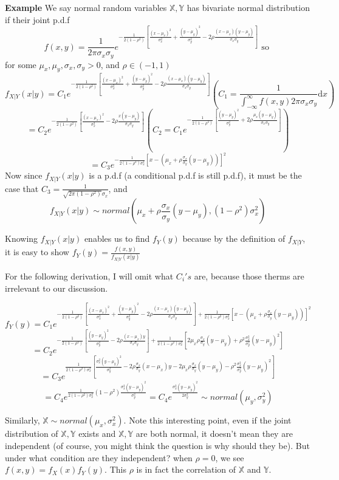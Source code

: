 \documentclass[a4paper,12pt]{article}
\begin{document}
\textbf{Example} We say normal random variables $\mathbb{X}, \mathbb{Y}$ has bivariate normal distribution if their joint p.d.f
$$f(x, y) = \frac{1}{2\pi\sigma_x\sigma_y}e^{ -\frac{1}{2(1-\rho^2)} [\frac{(x-\mu_x)^2}{\sigma^2_x} + \frac{(y-\mu_y)^2}{\sigma^2_y} - 2\rho\frac{(x-\mu_x)(y-\mu_y)}{\sigma_x\sigma_y}]} \text{ so }$$
for some $\mu_x, \mu_y, \sigma_x, \sigma_y > 0$, and $\rho \in (-1, 1)$
$$f_{X|Y}(x|y) = C_1 e^{ -\frac{1}{2(1-\rho^2)} [\frac{(x-\mu_x)^2}{\sigma^2_x} + \frac{(y-\mu_y)^2}{\sigma^2_y} - 2\rho\frac{(x-\mu_x)(y-\mu_y)}{\sigma_x\sigma_y}]} (C_1 = \frac{1}{\int_{-\infty}^\infty f(x, y) 2\pi\sigma_x\sigma_y} \mathrm{d}x)$$
$$= C_2 e^{ -\frac{1}{2(1-\rho^2)} [\frac{(x-\mu_x)^2}{\sigma^2_x} - 2\rho\frac{x(y-\mu_y)}{\sigma_x\sigma_y}] } (C_2 = C_1 e^{-\frac{1}{2(1-\rho^2)} [ \frac{(y-\mu_y)^2}{\sigma^2_y} + 2\rho\frac{\mu_x(y-\mu_y)}{\sigma_x\sigma_y}]})$$
$$= C_3 e^{-\frac{1}{2(1-\rho^2)\sigma^2_x} [x-(\mu_x + \rho\frac{\sigma_x}{\sigma_y}(y-\mu_y))]^2}$$
Now since $f_{X|Y}(x|y)$ is a p.d.f (a conditional p.d.f is still p.d.f), it must be the case that $C_3 = \frac{1}{\sqrt{2\pi(1-\rho^2)}\sigma_x}$, and $$f_{X|Y}(x|y) \sim normal( \mu_x + \rho\frac{\sigma_x}{\sigma_y}(y-\mu_y), (1-\rho^2)\sigma^2_x )$$

Knowing $f_{X|Y}(x|y)$ enables us to find $f_Y(y)$ because by the definition of $f_{X|Y}$, it is easy to show $f_Y(y) = \frac{f(x, y)}{f_{X|Y}(x|y)} $ 

For the following derivation, I will omit what $C_i's$ are, because those therms are irrelevant to our discussion.

$$f_Y(y) = C_1 e^{ -\frac{1}{2(1-\rho^2)} [\frac{(x-\mu_x)^2}{\sigma^2_x} + \frac{(y-\mu_y)^2}{\sigma^2_y} - 2\rho\frac{(x-\mu_x)(y-\mu_y)}{\sigma_x\sigma_y}] + \frac{1}{2(1-\rho^2)\sigma^2_x} [x-(\mu_x + \rho\frac{\sigma_x}{\sigma_y}(y-\mu_y))]^2}$$
$$= C_2 e^{ -\frac{1}{2(1-\rho^2)} [ \frac{(y-\mu_y)^2}{\sigma^2_y} - 2\rho\frac{(x-\mu_x)y}{\sigma_x\sigma_y}] + \frac{1}{2(1-\rho^2)\sigma^2_x} [2\mu_x\rho\frac{\sigma_x}{\sigma_y}(y-\mu_y) + \rho^2\frac{\sigma^2_x}{\sigma^2_y}(y-\mu_y)^2]}$$
$$= C_3 e^{ \frac{1}{2(1-\rho^2)\sigma^2_x} [ \frac{\sigma^2_x(y-\mu_y)^2}{\sigma^2_y} - 2\rho\frac{\sigma_x}{\sigma_y}(x-\mu_x)y - 2\mu_x\rho\frac{\sigma_x}{\sigma_y}(y-\mu_y) - \rho^2\frac{\sigma^2_x}{\sigma^2_y}(y-\mu_y)^2]  }$$
$$= C_4 e^{ \frac{1}{2(1-\rho^2)\sigma^2_x}  (1-\rho^2) \frac{\sigma^2_x(y-\mu_y)^2}{\sigma^2_y}} = C_4 e^{ \frac{\sigma^2_x(y-\mu_y)^2}{2\sigma^2_y}} \sim normal( \mu_y, \sigma^2_y )$$

Similarly, $\mathbb{X} \sim  normal( \mu_x, \sigma^2_x)$. Note this interesting point, even if the joint distribution of $\mathbb{X}, \mathbb{Y}$ exists and $\mathbb{X}, \mathbb{Y}$ are both normal, it doesn't mean they are independent (of course, you might think the question is why should they be). But under what condition are they independent? when $\rho = 0$, we see $f(x, y) = f_X(x)f_Y(y)$. This $\rho$ is in fact the correlation of $\mathbb{X}$ and $\mathbb{Y}$. 
\end{document}
